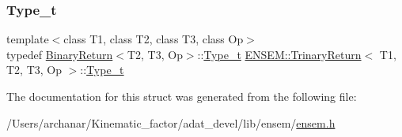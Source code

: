 \mbox{\label{structENSEM_1_1TrinaryReturn_a3b5bb49c40f17dcf3bdb007c9e591b0e}} 
\subsubsection{\texorpdfstring{Type\_t}{Type\_t}\hspace{0.1cm}{\footnotesize\ttfamily [2/2]}}
{\footnotesize\ttfamily template$<$class T1, class T2, class T3, class Op$>$ \\
typedef \mbox{\hyperlink{structENSEM_1_1BinaryReturn}{Binary\+Return}}$<$T2, T3, Op$>$\+::\mbox{\hyperlink{structENSEM_1_1TrinaryReturn_a3b5bb49c40f17dcf3bdb007c9e591b0e}{Type\+\_\+t}} \mbox{\hyperlink{structENSEM_1_1TrinaryReturn}{E\+N\+S\+E\+M\+::\+Trinary\+Return}}$<$ T1, T2, T3, Op $>$\+::\mbox{\hyperlink{structENSEM_1_1TrinaryReturn_a3b5bb49c40f17dcf3bdb007c9e591b0e}{Type\+\_\+t}}}



The documentation for this struct was generated from the following file\+:\begin{DoxyCompactItemize}
\item 
/\+Users/archanar/\+Kinematic\+\_\+factor/adat\+\_\+devel/lib/ensem/\mbox{\hyperlink{lib_2ensem_2ensem_8h}{ensem.\+h}}\end{DoxyCompactItemize}
